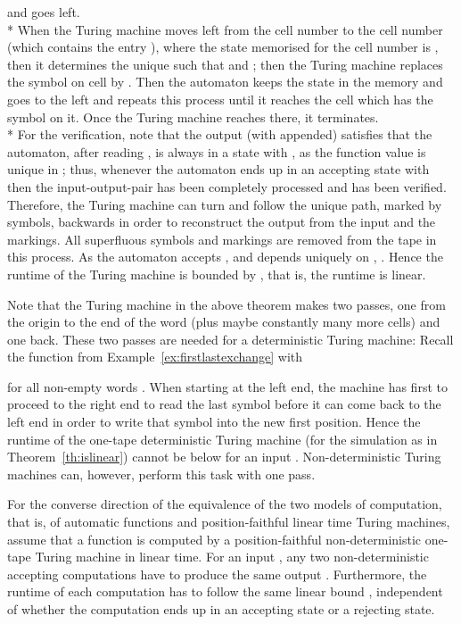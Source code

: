 \documentclass{LMCS}
\theoremstyle{plain}\newtheorem{athm}[thm]{Theorem}
\theoremstyle{plain}\newtheorem{aprop}[thm]{Proposition}
\theoremstyle{plain}\newtheorem{aprob}[thm]{Open Problem}
\theoremstyle{plain}\newtheorem{acor}[thm]{Corollary}
\theoremstyle{plain}\newtheorem{alem}[thm]{Lemma}
\theoremstyle{definition}\newtheorem{adefn}[thm]{Definition}
\theoremstyle{definition}\newtheorem{arem}[thm]{Remark}
\theoremstyle{plain}\newtheorem{aexmp}[thm]{Example}
\theoremstyle{plain}\newtheorem{aclm}[thm]{Claim}
\def\niceqed{~~}
\def\sp{\\*\indent}
\begin{document}
and goes left. 
\sp
When the Turing machine moves left from the cell number  to the cell 
number  (which contains the entry ),
where the state memorised for the cell number  is , 
then it determines the
unique  such that  and
;
then the Turing machine 
replaces the symbol on cell  by .
Then the automaton keeps the state  in the memory and goes to
the left and repeats this
process until it reaches the cell which has the symbol
 on it. Once the Turing machine reaches there, it
terminates.
\sp
For the verification, note that the output  
(with  appended) satisfies
that the automaton, after reading , is always in a state 
with ,
as the function value  is unique in ;
thus, whenever the automaton ends up in an accepting state  with
 then the input-output-pair
 has
been completely processed and  has been
verified. Therefore, the Turing machine can turn and follow the
unique path, marked by  symbols, backwards in order to reconstruct
the output from the input and the markings. All superfluous symbols
and markings are removed from the tape in this process. 
As the automaton accepts ,
and  depends uniquely on , . 
Hence the runtime
of the Turing machine is bounded by , that is, the
runtime is linear.\niceqed

\begin{rem}
Note that the Turing machine in the above theorem 
makes two passes, one from the origin to
the end of the word (plus maybe constantly many more cells)
and one back. These two passes are needed
for a deterministic Turing machine: Recall
the function  from Example~\ref{ex:firstlastexchange} with

for all non-empty words . When starting at the left
end, the machine has first to proceed to the right end to read the last
symbol before it can come back to the left end in order to write that
symbol into the new first position. Hence the runtime of the one-tape
deterministic Turing machine (for the simulation as in
Theorem~\ref{th:islinear})
cannot be below  for an input . Non-deterministic Turing
machines can, however, perform this task with one pass.
\end{rem}

\noindent
For the converse direction of the equivalence of the two models
of computation, that is, of automatic functions and position-faithful linear
time Turing machines, assume that a function is computed by a position-faithful
non-deterministic one-tape Turing machine in linear time.
For an input , any two non-deterministic
accepting computations have to produce the same output . Furthermore,
the runtime of each computation has to follow the same linear bound
, independent of whether the computation ends up in an
accepting state or a rejecting state.
\end{document}
